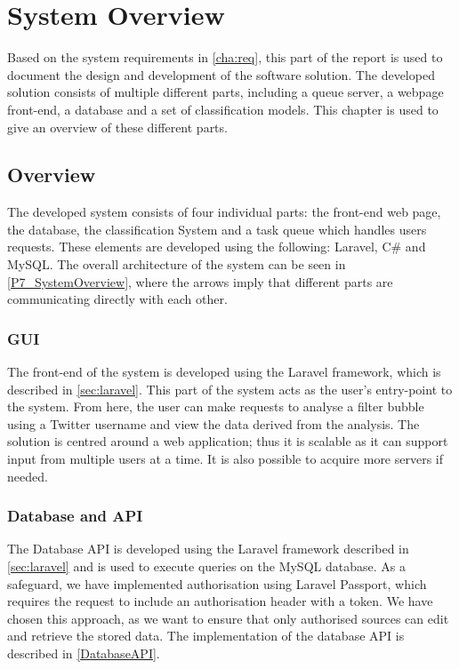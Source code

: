 \chapter{System Overview}\label{ch:sysview}
Based on the system requirements in \autoref{cha:req}, this part of the report
is used to document the design and development of the software solution. The
developed solution consists of multiple different parts, including a queue
server, a webpage front-end, a database and a set of classification models.
This chapter is used to give an overview of these different parts.

\section{Overview}
The developed system consists of four individual parts: the front-end web page,
the database, the classification System and a task queue which handles users
requests. These elements are developed using the following: Laravel, C\# and
MySQL. The overall architecture of the system can be seen in
\autoref{P7_SystemOverview}, where the arrows imply that different parts are
communicating directly with each other.
 

\subsection{GUI} %
The front-end of the system is developed using the Laravel framework, which is
described in \autoref{sec:laravel}. This part of the system acts as the user's
entry-point to the system. From here, the user can make requests to analyse a
filter bubble using a Twitter username and view the data derived from the
analysis. The solution is centred around a web application; thus it is scalable
as it can support input from multiple users at a time. It is also possible to
acquire more servers if needed.

\subsection{Database and API}
The Database \ac{API} is developed using the Laravel framework described in
\autoref{sec:laravel} and is used to execute queries on the MySQL database. As a
safeguard, we have implemented authorisation using Laravel Passport, which
requires the request to include an authorisation header with a 
token. We have chosen this approach, as we want to ensure that only authorised
sources can edit and retrieve the stored data. The implementation of the
database \ac{API} is described in \autoref{DatabaseAPI}.

